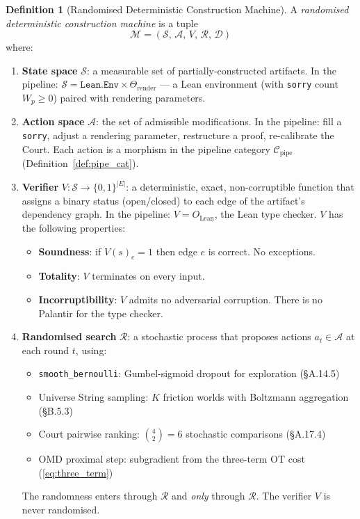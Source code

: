 \documentclass[11pt,a4paper]{article}
\theoremstyle{definition}
\newtheorem{definition}[theorem]{Definition}
\theoremstyle{remark}
\begin{document}
\begin{definition}[Randomised Deterministic Construction Machine]\label{def:rdcm}
A \emph{randomised deterministic construction machine} is a tuple
\[
  \mathcal{M} = (\mathcal{S},\, \mathcal{A},\, V,\, \mathcal{R},\, \mathcal{D})
\]
where:

\begin{enumerate}[nosep]
\item[(i)] \textbf{State space} $\mathcal{S}$: a measurable set of partially-constructed artifacts. In the pipeline: $\mathcal{S} = \texttt{Lean.Env} \times \Theta_{\mathrm{render}}$ --- a Lean environment (with \texttt{sorry} count $W_p \geq 0$) paired with rendering parameters.

\item[(ii)] \textbf{Action space} $\mathcal{A}$: the set of admissible modifications. In the pipeline: fill a \texttt{sorry}, adjust a rendering parameter, restructure a proof, re-calibrate the Court. Each action is a morphism in the pipeline category $\mathcal{C}_{\mathrm{pipe}}$ (Definition~\ref{def:pipe_cat}).

\item[(iii)] \textbf{Verifier} $V: \mathcal{S} \to \{0,1\}^{|E|}$: a deterministic, exact, non-corruptible function that assigns a binary status (open/closed) to each edge of the artifact's dependency graph. In the pipeline: $V = O_{\mathrm{Lean}}$, the Lean type checker. $V$ has the following properties:
  \begin{itemize}[nosep]
    \item \textbf{Soundness}: if $V(s)_e = 1$ then edge $e$ is correct. No exceptions.
    \item \textbf{Totality}: $V$ terminates on every input.
    \item \textbf{Incorruptibility}: $V$ admits no adversarial corruption. There is no Palantir for the type checker.
  \end{itemize}

\item[(iv)] \textbf{Randomised search} $\mathcal{R}$: a stochastic process that proposes actions $a_t \in \mathcal{A}$ at each round $t$, using:
  \begin{itemize}[nosep]
    \item \texttt{smooth\_bernoulli}: Gumbel-sigmoid dropout for exploration (\S A.14.5)
    \item Universe String sampling: $K$ friction worlds with Boltzmann aggregation (\S B.5.3)
    \item Court pairwise ranking: $\binom{4}{2} = 6$ stochastic comparisons (\S A.17.4)
    \item OMD proximal step: subgradient from the three-term OT cost (\ref{eq:three_term})
  \end{itemize}
  The randomness enters through $\mathcal{R}$ and \emph{only} through $\mathcal{R}$. The verifier $V$ is never randomised.


\end{enumerate}
\end{definition}
\end{document}
